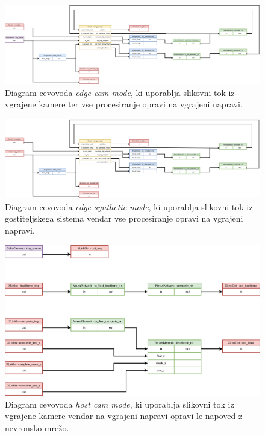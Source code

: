 \documentclass[a4paper,12pt,openright]{book}
\begin{document}
\begin{figure}[htb]
    \begin{center}
        \includegraphics[width=1\textwidth]{img/edge_cam.png}
    \end{center}
    \caption{Diagram cevovoda \emph{edge cam mode}, ki uporablja slikovni tok iz vgrajene kamere ter vse procesiranje opravi na vgrajeni napravi.}
    \label{img:edge_cam}
\end{figure}

\begin{figure}[htb]
    \begin{center}
        \includegraphics[width=1\textwidth]{img/edge_synth.png}
    \end{center}
    \caption{Diagram cevovoda \emph{edge synthetic mode}, ki uporablja slikovni tok iz gostiteljskega sistema vendar vse procesiranje opravi na vgrajeni napravi.}
    \label{img:edge_synth}
\end{figure}

\begin{figure}[htb]
    \begin{center}
        \includegraphics[width=1\textwidth]{img/host_cam.png}
    \end{center}
    \caption{Diagram cevovoda \emph{host cam mode}, ki uporablja slikovni tok iz vgrajene kamere vendar na vgrajeni napravi opravi le napoved z nevronsko mrežo.}
    \label{img:host_cam}
\end{figure}
\end{document}
